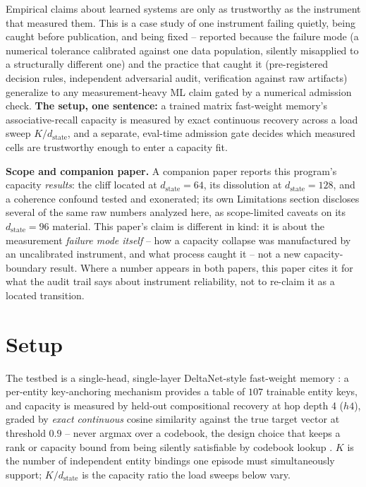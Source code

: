 \documentclass[10pt,letterpaper]{article}
\newcommand{\dstate}{d_{\mathrm{state}}}
\begin{document}
Empirical claims about learned systems are only as trustworthy as the
instrument that measured them. This is a case study of one instrument
failing quietly, being caught before publication, and being fixed --
reported because the failure mode (a numerical tolerance calibrated
against one data population, silently misapplied to a structurally
different one) and the practice that caught it (pre-registered decision
rules, independent adversarial audit, verification against raw artifacts)
generalize to any measurement-heavy ML claim gated by a numerical
admission check. \textbf{The setup, one sentence:} a trained matrix
fast-weight memory's associative-recall capacity is measured by exact
continuous recovery across a load sweep $K/\dstate$, and a separate,
eval-time admission gate decides which measured cells are trustworthy
enough to enter a capacity fit.

\textbf{Scope and companion paper.} A companion paper
\citep{larson2026capacitycliff} reports this program's capacity
\emph{results}: the cliff located at $\dstate=64$, its dissolution at
$\dstate=128$, and a coherence confound tested and exonerated; its own
Limitations section discloses several of the same raw numbers analyzed
here, as scope-limited caveats on its $\dstate=96$ material. This paper's
claim is different in kind: it is about the measurement \emph{failure
mode itself} -- how a capacity collapse was manufactured by an
uncalibrated instrument, and what process caught it -- not a new
capacity-boundary result. Where a number appears in both papers, this
paper cites it for what the audit trail says about instrument
reliability, not to re-claim it as a located transition.

\section{Setup}
\label{sec:setup}

The testbed is a single-head, single-layer DeltaNet-style fast-weight
memory \citep{schlag2021linear}: a per-entity key-anchoring mechanism
provides a table of $107$ trainable entity keys, and capacity is measured
by held-out compositional recovery at hop depth 4 ($h4$), graded by
\emph{exact continuous} cosine similarity against the true target vector
at threshold $0.9$ -- never argmax over a codebook, the design choice that
keeps a rank or capacity bound from being silently satisfiable by
codebook lookup \citep{nichani2025factual}. $K$ is the number of
independent entity bindings one episode must simultaneously support;
$K/\dstate$ is the capacity ratio the load sweeps below vary.
\end{document}
